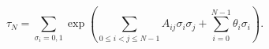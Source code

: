 \begin{equation}
\tau_N = \sum_{\sigma_i=0,1} \exp \left( \sum_{0\leq i<j \le N-1 } A_{ij}
\sigma_i \sigma_j + \sum_{i=0}^{N-1} \theta_i\sigma_i \right).
\label{N_soliton}\end{equation}

